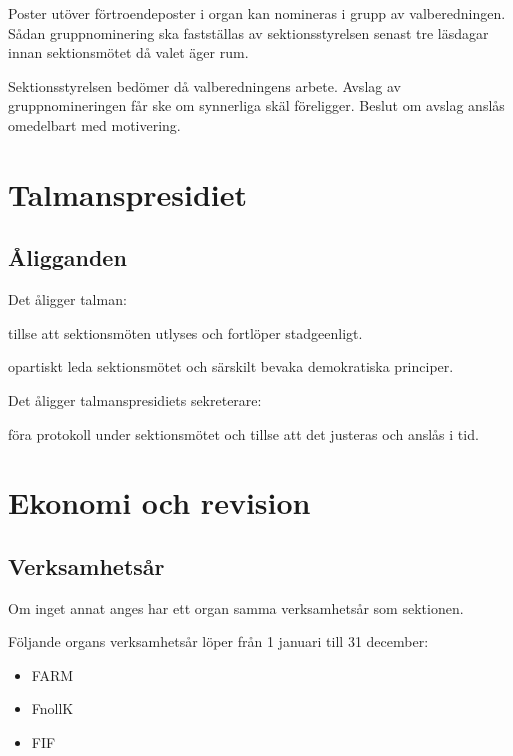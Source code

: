 \documentclass{styrdokument}
\begin{document}
\? Poster utöver förtroendeposter i organ kan nomineras i grupp av valberedningen.
Sådan gruppnominering ska fastställas av sektionsstyrelsen senast tre läsdagar innan sektionsmötet då valet äger rum.
\label{valb:grupp}

\? Sektionsstyrelsen bedömer då valberedningens arbete. 
Avslag av gruppnomineringen får ske om synnerliga skäl föreligger.
Beslut om avslag anslås omedelbart med motivering.


\section{Talmanspresidiet}
\subsection{Åligganden}
\? Det åligger talman:
\begin{aligganden}
    \item tillse att sektionsmöten utlyses och fortlöper stadgeenligt.
    \item opartiskt leda sektionsmötet och särskilt bevaka demokratiska principer.
\end{aligganden}

\? Det åligger talmanspresidiets sekreterare:
\begin{aligganden}
    \item föra protokoll under sektionsmötet och tillse att det justeras och anslås i tid.
\end{aligganden}


\section{Ekonomi och revision}
\subsection{Verksamhetsår}
\? Om inget annat anges har ett organ samma verksamhetsår som sektionen.

\? Följande organs verksamhetsår löper från 1 januari till 31 december:
\begin{itemize}
    \item FARM
    \item FnollK
    \item FIF
\end{itemize} 
\end{document}
